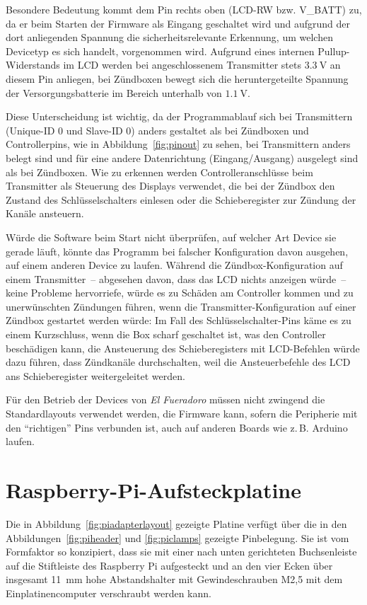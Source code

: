 \documentclass[paper=a4, parskip, numbers=noenddot, toc=listof, headsepline]{scrbook}
\newcommand{\anlage}{\emph{El Fueradoro}}
\begin{document}
		  Besondere Bedeutung kommt dem Pin rechts oben (LCD-RW bzw. V\_BATT) zu, da er beim Starten der Firmware als Eingang geschaltet wird und aufgrund der dort anliegenden Spannung die sicherheitsrelevante Erkennung, um welchen Devicetyp es sich handelt, vorgenommen wird. Aufgrund eines internen Pullup-Widerstands im LCD werden bei angeschlossenem Transmitter stets $\SI{3,3}{\volt}$ an diesem Pin anliegen, bei Zündboxen bewegt sich die heruntergeteilte Spannung der Versorgungsbatterie im Bereich unterhalb von $\SI{1,1}{\volt}$.

		  Diese Unterscheidung ist wichtig, da der Programmablauf sich bei Transmittern (Unique-ID 0 und Slave-ID 0) anders gestaltet als bei Zündboxen und Controllerpins, wie in Abbildung~\ref{fig:pinout} zu sehen, bei Transmittern anders belegt sind und für eine andere Datenrichtung (Eingang/Ausgang) ausgelegt sind als bei Zündboxen.  Wie zu erkennen werden Controlleranschlüsse beim Transmitter als Steuerung des Displays verwendet, die bei der Zündbox den Zustand des Schlüsselschalters einlesen oder die Schieberegister zur Zündung der Kanäle ansteuern.

		  Würde die Software beim Start nicht überprüfen, auf welcher Art Device sie gerade läuft, könnte das Programm bei falscher Konfiguration davon ausgehen, auf einem anderen Device zu laufen. Während die Zündbox-Konfiguration auf einem Transmitter~-- abgesehen davon, dass das LCD nichts anzeigen würde~-- keine Probleme hervorriefe, würde es zu Schäden am Controller kommen und zu unerwünschten Zündungen führen, wenn die Transmitter-Konfiguration auf einer Zündbox gestartet werden würde: Im Fall des Schlüsselschalter-Pins käme es  zu einem Kurzschluss, wenn die Box scharf geschaltet ist, was den Controller beschädigen kann, die Ansteuerung des Schieberegisters mit LCD-Befehlen würde dazu führen, dass Zündkanäle durchschalten, weil die Ansteuerbefehle des LCD ans Schieberegister weitergeleitet werden.

		  Für den Betrieb der Devices von {\anlage} müssen nicht zwingend die Standardlayouts verwendet werden, die Firmware kann, sofern die Peripherie mit den \enquote{richtigen} Pins verbunden ist, auch auf anderen Boards wie z.\,B. Arduino laufen.

		 \section{Raspberry-Pi-Aufsteckplatine}

		  Die in Abbildung~\ref{fig:piadapterlayout} gezeigte Platine verfügt über die in den Abbildungen~\ref{fig:piheader} und \ref{fig:piclamps} gezeigte Pinbelegung. Sie ist vom Formfaktor so konzipiert, dass sie mit einer nach unten gerichteten Buchsenleiste auf die Stiftleiste des Raspberry Pi aufgesteckt und an den vier Ecken über insgesamt \SI{11}{\milli\metre} hohe Abstandshalter mit Gewindeschrauben M2,5 mit dem Einplatinencomputer verschraubt werden kann.
\end{document}
